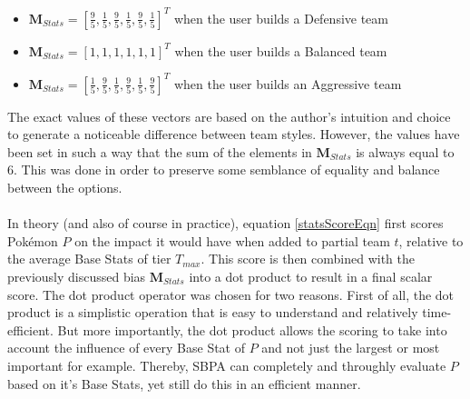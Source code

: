 \documentclass{article}
\begin{document}
\begin{itemize}
	\item $\textbf{M}_{Stats}=[\frac{9}{5},\frac{1}{5},\frac{9}{5},\frac{1}{5},\frac{9}{5},\frac{1}{5}]^T$ when the user builds a Defensive team
	\item $\textbf{M}_{Stats}=[1,1,1,1,1,1]^T$ when the user builds a Balanced team
	\item $\textbf{M}_{Stats}=[\frac{1}{5},\frac{9}{5},\frac{1}{5},\frac{9}{5},\frac{1}{5},\frac{9}{5}]^T$ when the user builds an Aggressive team
\end{itemize}
The exact values of these vectors are based on the author's intuition and choice to generate a noticeable difference between team styles. However, the values have been set in such a way that the sum of the elements in $\textbf{M}_{Stats}$ is always equal to 6. This was done in order to preserve some semblance of equality and balance between the options.\\\\
In theory (and also of course in practice), equation \ref{statsScoreEqn} first scores Pok\'emon $P$ on the impact it would have when added to partial team $t$, relative to the average Base Stats of tier $T_{max}$. This score is then combined with the previously discussed bias $\textbf{M}_{Stats}$ into a dot product to result in a final scalar score. The dot product operator was chosen for two reasons. First of all, the dot product is a simplistic operation that is easy to understand and relatively time-efficient. But more importantly, the dot product allows the scoring to take into account the influence of every Base Stat of $P$ and not just the largest or most important for example. Thereby, SBPA can completely and throughly evaluate $P$ based on it's Base Stats, yet still do this in an efficient manner.
\end{document}
